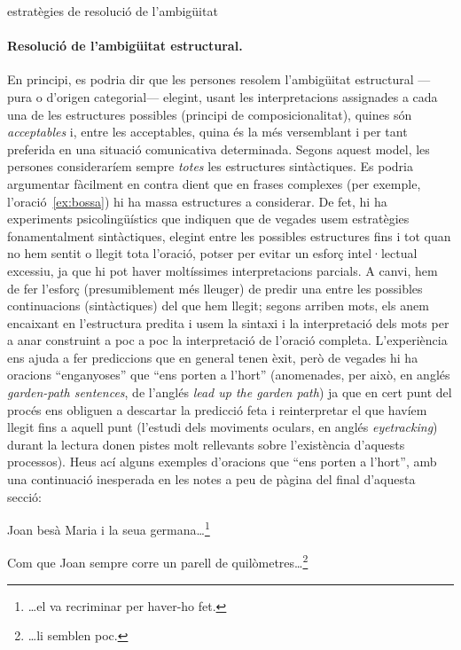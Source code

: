 \begin{persabermes}{estratègies de resolució de l'ambigüitat}
  \paragraph{Resolució de l'ambigüitat estructural.}
  \label{s3:resambest}
  En principi, es podria dir que les persones resolem l'ambigüitat
  estructural ---pura o d'origen categorial--- elegint, usant les
  interpretacions assignades a cada una de les estructures possibles
  (principi de composicionalitat), quines són \emph{acceptables} i,
  entre les acceptables, quina és la més versemblant i per tant
  preferida en una situació comunicativa determinada. Segons aquest
  model, les persones consideraríem sempre \emph{totes} les
  estructures sintàctiques. Es podria argumentar fàcilment en contra
  dient que en frases complexes (per exemple, l'oració~\ref{ex:bossa})
  hi ha massa estructures a considerar. De fet, hi ha experiments
  psicolingüístics que indiquen que de vegades usem estratègies
  fonamentalment sintàctiques, elegint entre les possibles estructures
  fins i tot quan no hem sentit o llegit tota l'oració, potser per
  evitar un esforç intel·lectual excessiu, ja que hi pot haver
  moltíssimes interpretacions parcials. A canvi, hem de fer l'esforç
  (presumiblement més lleuger) de predir una entre les possibles
  continuacions (sintàctiques) del que hem llegit; segons arriben
  mots, els anem encaixant en l'estructura predita i usem la sintaxi i
  la interpretació dels mots per a anar construint a poc a poc la
  interpretació de l'oració completa.  L'experiència ens ajuda a fer
  prediccions que en general tenen èxit, però de vegades hi ha
  oracions ``enganyoses'' que ``ens porten a l'hort'' (anomenades, per
  això, en anglés \emph{garden-path sentences}, de l'anglés \emph{lead
    up the garden path}) ja que en cert punt del procés ens obliguen a
  descartar la predicció feta i reinterpretar el que havíem llegit
  fins a aquell punt (l'estudi dels moviments oculars, en
    anglés \emph{eyetracking}) durant la lectura donen pistes molt
  rellevants sobre l'existència d'aquests processos).  Heus ací alguns
  exemples d'oracions que ``ens porten a l'hort'', amb una continuació
  inesperada en les notes a peu de pàgina del final d'aquesta secció:
  \begin{exemple}
    Joan besà Maria i la seua germana\ldots\footnote{\ldots el va
      recriminar per haver-ho fet.}
  \end{exemple}
  \begin{exemple}
    Com que Joan sempre corre un parell de
    quilòmetres\ldots\footnote{\ldots li semblen poc.}

\end{exemple}
\end{persabermes}
